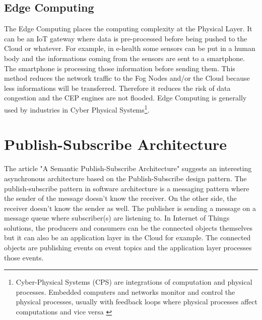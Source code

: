 \documentclass[11pt]{article}
\begin{document}

\subsection{Edge Computing}

The Edge Computing places the computing complexity at the Physical Layer. It can be an IoT gateway where data is pre-processed before being pushed to the Cloud or whatever. For example, in e-health some sensors can be put in a human body and the informations coming from the sensors are sent to a smartphone. The smartphone is processing those information before sending them. This method reduces the network traffic to the Fog Nodes and/or the Cloud because less informations will be transferred. Therefore it reduces the risk of data congestion and the CEP engines are not flooded. Edge Computing is generally used by industries in Cyber Physical Systems\footnote{Cyber-Physical Systems (CPS) are integrations of computation and physical processes. Embedded computers and networks monitor and control the physical processes, usually with feedback loops where physical processes affect computations and vice versa \cite{5}}.


\section{Publish-Subscribe Architecture} \label{pub-sub}

The article "A Semantic Publish-Subscribe Architecture" \cite{A-Semantic-Publish-Subscribe-Architecture} suggests an interesting asynchronous architecture based on the Publish-Subscribe design pattern. The publish-subscribe pattern in software architecture is a messaging pattern where the sender of the message doesn't know the receiver. On the other side, the receiver doesn't know the sender as well. The publisher is sending a message on a message queue where subscriber(s) are listening to. In Internet of Things solutions, the producers and consumers can be the connected objects themselves but it can also be an application layer in the Cloud for example. The connected objects are publishing events on event topics and the application layer processes those events.
\end{document}
